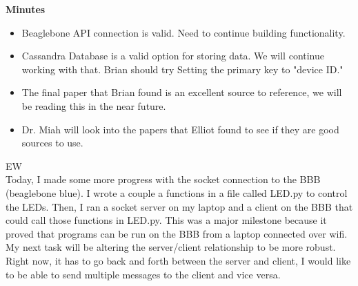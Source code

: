 \documentclass[fontsize=11pt, %
                             paper=letter, %
                             openany, %
                             captions=tableheading,
                             index=totoc,
                             hyperref]{labbook}
\begin{document}
\textbf{Minutes}
\begin{itemize}
\item Beaglebone API connection is valid. Need to continue building functionality.
\item Cassandra Database is a valid option for storing data. We will continue working with that. Brian should try Setting the primary key to "device ID."
\item The final paper that Brian found is an excellent source to reference, we will be reading this in the near future.
\item Dr. Miah will look into the papers that Elliot found to see if they are good sources to use.
\end{itemize}

EW\\
Today, I made some more progress with the socket connection to the BBB (beaglebone blue). I wrote a couple a functions in a file called LED.py to control the LEDs. Then, I ran a socket server on my laptop and a client on the BBB that could call those functions in LED.py. This was a major milestone because it proved that programs can be run on the BBB from a laptop connected over wifi. My next task will be altering the server/client relationship to be more robust. Right now, it has to go back and forth between the server and client, I would like to be able to send multiple messages to the client and vice versa.
\end{document}
